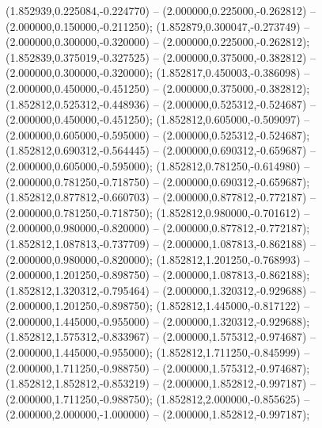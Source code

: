  (1.852939,0.225084,-0.224770) -- (2.000000,0.225000,-0.262812) -- (2.000000,0.150000,-0.211250);
 (1.852879,0.300047,-0.273749) -- (2.000000,0.300000,-0.320000) -- (2.000000,0.225000,-0.262812);
 (1.852839,0.375019,-0.327525) -- (2.000000,0.375000,-0.382812) -- (2.000000,0.300000,-0.320000);
 (1.852817,0.450003,-0.386098) -- (2.000000,0.450000,-0.451250) -- (2.000000,0.375000,-0.382812);
 (1.852812,0.525312,-0.448936) -- (2.000000,0.525312,-0.524687) -- (2.000000,0.450000,-0.451250);
 (1.852812,0.605000,-0.509097) -- (2.000000,0.605000,-0.595000) -- (2.000000,0.525312,-0.524687);
 (1.852812,0.690312,-0.564445) -- (2.000000,0.690312,-0.659687) -- (2.000000,0.605000,-0.595000);
 (1.852812,0.781250,-0.614980) -- (2.000000,0.781250,-0.718750) -- (2.000000,0.690312,-0.659687);
 (1.852812,0.877812,-0.660703) -- (2.000000,0.877812,-0.772187) -- (2.000000,0.781250,-0.718750);
 (1.852812,0.980000,-0.701612) -- (2.000000,0.980000,-0.820000) -- (2.000000,0.877812,-0.772187);
 (1.852812,1.087813,-0.737709) -- (2.000000,1.087813,-0.862188) -- (2.000000,0.980000,-0.820000);
 (1.852812,1.201250,-0.768993) -- (2.000000,1.201250,-0.898750) -- (2.000000,1.087813,-0.862188);
 (1.852812,1.320312,-0.795464) -- (2.000000,1.320312,-0.929688) -- (2.000000,1.201250,-0.898750);
 (1.852812,1.445000,-0.817122) -- (2.000000,1.445000,-0.955000) -- (2.000000,1.320312,-0.929688);
 (1.852812,1.575312,-0.833967) -- (2.000000,1.575312,-0.974687) -- (2.000000,1.445000,-0.955000);
 (1.852812,1.711250,-0.845999) -- (2.000000,1.711250,-0.988750) -- (2.000000,1.575312,-0.974687);
 (1.852812,1.852812,-0.853219) -- (2.000000,1.852812,-0.997187) -- (2.000000,1.711250,-0.988750);
 (1.852812,2.000000,-0.855625) -- (2.000000,2.000000,-1.000000) -- (2.000000,1.852812,-0.997187);
